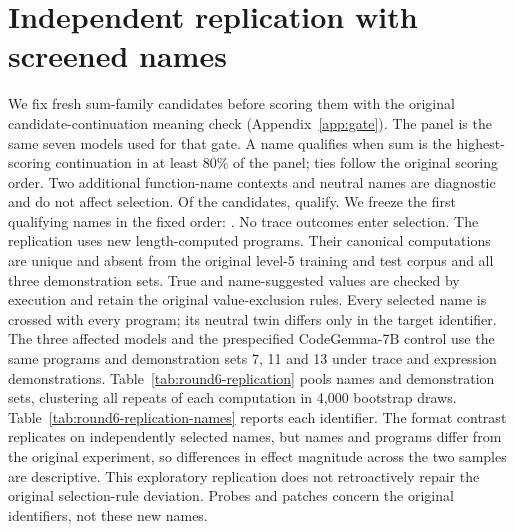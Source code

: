 \section{Independent replication with screened names}
\label{app:round6-identifiers}
We fix  fresh sum-family candidates before scoring them with the original candidate-continuation meaning check (Appendix~\ref{app:gate}). The panel is the same seven models used for that gate. A name qualifies when sum is the highest-scoring continuation in at least 80\% of the panel; ties follow the original scoring order. Two additional function-name contexts and neutral names are diagnostic and do not affect selection. Of the candidates,  qualify. We freeze the first  qualifying names in the fixed order: . No trace outcomes enter selection.
The replication uses  new length-computed programs. Their canonical computations are unique and absent from the original level-5 training and test corpus and all three demonstration sets. True and name-suggested values are checked by execution and retain the original value-exclusion rules. Every selected name is crossed with every program; its neutral twin differs only in the target identifier. The three affected models and the prespecified CodeGemma-7B control use the same programs and demonstration sets 7, 11 and 13 under trace and expression demonstrations.
Table~\ref{tab:round6-replication} pools names and demonstration sets, clustering all repeats of each computation in 4,000 bootstrap draws. Table~\ref{tab:round6-replication-names} reports each identifier. The format contrast replicates on independently selected names, but names and programs differ from the original experiment, so differences in effect magnitude across the two samples are descriptive. This exploratory replication does not retroactively repair the original selection-rule deviation. Probes and patches concern the original identifiers, not these new names.
